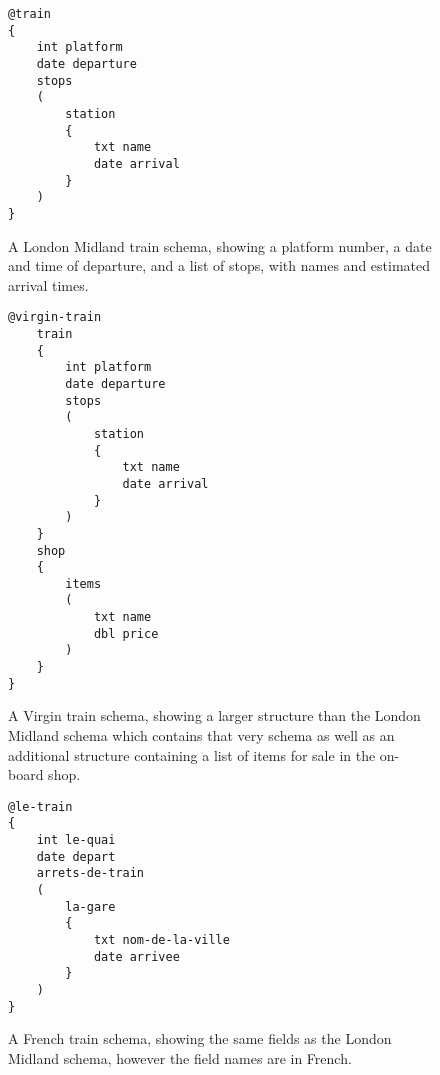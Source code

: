 \begin{figure}[h]
\begin{lstlisting}
@train
{
    int platform
    date departure
    stops
    (
    	station
    	{
    		txt name
    		date arrival
    	}
    )
}
\end{lstlisting}
\caption[Example schema for a London Midland train]{A London Midland train schema, showing a platform number, a date and time of departure, and a list of stops, with names and estimated arrival times.}
\label{fig:londonmidlandtrain}
\end{figure}

\begin{figure}[h]
\begin{lstlisting}
@virgin-train
	train
	{
		int platform
		date departure
		stops
		(
			station
			{
				txt name
				date arrival
			}
		)
	}
	shop
	{
		items
		(
			txt name
			dbl price
		)
	}
}
\end{lstlisting}
\caption[Example schema for a Virgin train]{A Virgin train schema, showing a larger structure than the London Midland schema which contains that very schema as well as an additional structure containing a list of items for sale in the on-board shop.}
\label{fig:virgintrain}
\end{figure}


\begin{figure}[h]
\begin{lstlisting}
@le-train
{
    int le-quai
    date depart
    arrets-de-train
    (
    	la-gare
    	{
    		txt nom-de-la-ville
    		date arrivee
    	}
    )
}
\end{lstlisting}
\caption[Example schema for a French train]{A French train schema, showing the same fields as the London Midland schema, however the field names are in French.}
\label{fig:frenchtrain}
\end{figure}
